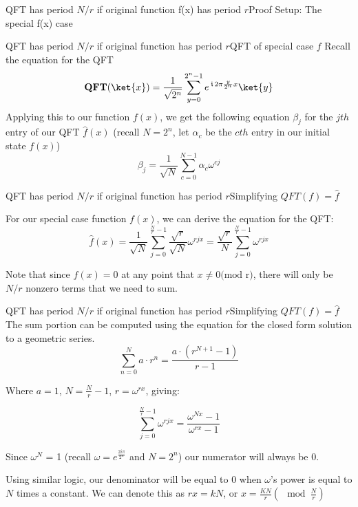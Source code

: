 {\begin{frame}{QFT has period $N/r$ if original function f(x) has period $r$}{Proof Setup: The special f(x) case}
\begin{itemize}
   
\end{itemize}%
    
\end{frame}

\begin{frame}{QFT has period $N/r$ if original function has period $r$}{QFT of special case $f$}
Recall the equation for the QFT
\[ \QFT(\ket{x}) = \RootTwoN{n}\SumPH{y}{n} \ExpPhase{2\pi \frac{y}{2^n} x} \ket{y}\]
Applying this to our function $f(x)$, we get the following equation $\beta_j$ for the $jth$ entry of our QFT $\hat{f}(x)$ (recall $N = {2^n}$, let $\alpha_c$ be the $cth$ entry in our initial state $f(x)$)
\[
\beta_j = \frac{1}{\sqrt{N}} \sum_{c=0}^{N-1} \alpha_c \omega^{cj}
\]
\end{frame}

\begin{frame}{QFT has period $N/r$ if original function has period $r$}{Simplifying $QFT(f) = \hat{f}$}

For our special case function $f(x)$, we can derive the equation for the QFT:
\[
    \hat{f}(x) = \frac{1}{\sqrt{N}} \sum_{j=0}^{\frac{N}{r}-1} \frac{\sqrt{r}}{\sqrt{N}}\omega^{rjx} = \frac{\sqrt{r}}{N} \sum_{j=0}^{\frac{N}{r}-1} \omega^{rjx}
\]

Note that since $f(x) = 0$ at any point that $x \neq 0 \text{(mod r)}$, there will only be $N/r$ nonzero terms that we need to sum. 
\end{frame}

\begin{frame}{QFT has period $N/r$ if original function has period $r$}{Simplifying $QFT(f) = \hat{f}$}
The sum portion can be computed using the equation for the closed form solution to a geometric series.
\[
\sum_{n=0}^{N} a \cdot r^{n} = \frac{a \cdot (r^{N+1} - 1)}{r-1}
\]

Where \(a=1\), \(N=\frac{N}{r}-1\), \(r=\omega^{rx}\), giving:

\[
    \sum_{j=0}^{\frac{N}{r}-1} \omega^{rjx} = \frac{\omega^{Nx}-1}{\omega^{rx}-1}
\]

Since $\omega^{N}$ = 1 (recall $\omega = e^{\frac{2i\pi}{2^n}}$ and $N = 2^n$) our numerator will always be $0$.

Using similar logic, our denominator will be equal to $0$ when $\omega$'s power is equal to $N$ times a constant. We can denote this as $rx = kN$, or $x = \frac{KN}{r} (\mod{\frac{N}{r}})$


\end{frame}}
